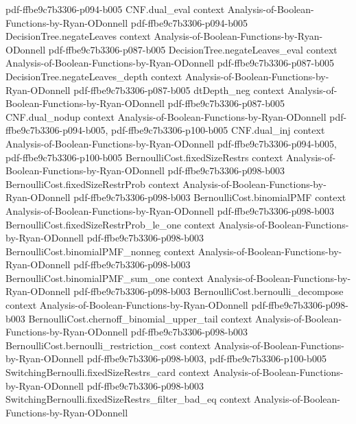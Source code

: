 \begin{theorem}
  {pdf-ffbe9c7b3306-p094-b005}
\proofstep
  {CNF.dual_eval}
  {context}
  {Analysis-of-Boolean-Functions-by-Ryan-ODonnell}
  {pdf-ffbe9c7b3306-p094-b005}
\proofstep
  {DecisionTree.negateLeaves}
  {context}
  {Analysis-of-Boolean-Functions-by-Ryan-ODonnell}
  {pdf-ffbe9c7b3306-p087-b005}
\proofstep
  {DecisionTree.negateLeaves_eval}
  {context}
  {Analysis-of-Boolean-Functions-by-Ryan-ODonnell}
  {pdf-ffbe9c7b3306-p087-b005}
\proofstep
  {DecisionTree.negateLeaves_depth}
  {context}
  {Analysis-of-Boolean-Functions-by-Ryan-ODonnell}
  {pdf-ffbe9c7b3306-p087-b005}
\proofstep
  {dtDepth_neg}
  {context}
  {Analysis-of-Boolean-Functions-by-Ryan-ODonnell}
  {pdf-ffbe9c7b3306-p087-b005}
\proofstep
  {CNF.dual_nodup}
  {context}
  {Analysis-of-Boolean-Functions-by-Ryan-ODonnell}
  {pdf-ffbe9c7b3306-p094-b005,
    pdf-ffbe9c7b3306-p100-b005}
\proofstep
  {CNF.dual_inj}
  {context}
  {Analysis-of-Boolean-Functions-by-Ryan-ODonnell}
  {pdf-ffbe9c7b3306-p094-b005,
    pdf-ffbe9c7b3306-p100-b005}
\proofstep
  {BernoulliCost.fixedSizeRestrs}
  {context}
  {Analysis-of-Boolean-Functions-by-Ryan-ODonnell}
  {pdf-ffbe9c7b3306-p098-b003}
\proofstep
  {BernoulliCost.fixedSizeRestrProb}
  {context}
  {Analysis-of-Boolean-Functions-by-Ryan-ODonnell}
  {pdf-ffbe9c7b3306-p098-b003}
\proofstep
  {BernoulliCost.binomialPMF}
  {context}
  {Analysis-of-Boolean-Functions-by-Ryan-ODonnell}
  {pdf-ffbe9c7b3306-p098-b003}
\proofstep
  {BernoulliCost.fixedSizeRestrProb_le_one}
  {context}
  {Analysis-of-Boolean-Functions-by-Ryan-ODonnell}
  {pdf-ffbe9c7b3306-p098-b003}
\proofstep
  {BernoulliCost.binomialPMF_nonneg}
  {context}
  {Analysis-of-Boolean-Functions-by-Ryan-ODonnell}
  {pdf-ffbe9c7b3306-p098-b003}
\proofstep
  {BernoulliCost.binomialPMF_sum_one}
  {context}
  {Analysis-of-Boolean-Functions-by-Ryan-ODonnell}
  {pdf-ffbe9c7b3306-p098-b003}
\proofstep
  {BernoulliCost.bernoulli_decompose}
  {context}
  {Analysis-of-Boolean-Functions-by-Ryan-ODonnell}
  {pdf-ffbe9c7b3306-p098-b003}
\proofstep
  {BernoulliCost.chernoff_binomial_upper_tail}
  {context}
  {Analysis-of-Boolean-Functions-by-Ryan-ODonnell}
  {pdf-ffbe9c7b3306-p098-b003}
\proofstep
  {BernoulliCost.bernoulli_restriction_cost}
  {context}
  {Analysis-of-Boolean-Functions-by-Ryan-ODonnell}
  {pdf-ffbe9c7b3306-p098-b003,
    pdf-ffbe9c7b3306-p100-b005}
\proofstep
  {SwitchingBernoulli.fixedSizeRestrs_card}
  {context}
  {Analysis-of-Boolean-Functions-by-Ryan-ODonnell}
  {pdf-ffbe9c7b3306-p098-b003}
\proofstep
  {SwitchingBernoulli.fixedSizeRestrs_filter_bad_eq}
  {context}
  {Analysis-of-Boolean-Functions-by-Ryan-ODonnell}

\end{theorem}
